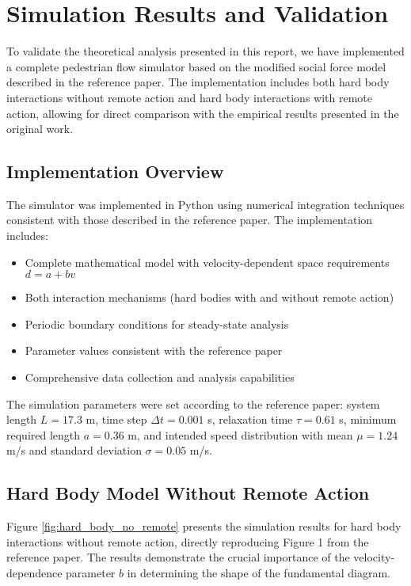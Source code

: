 \documentclass[12pt,a4paper]{article}
\begin{document}
\section{Simulation Results and Validation}

To validate the theoretical analysis presented in this report, we have implemented a complete pedestrian flow simulator based on the modified social force model described in the reference paper. The implementation includes both hard body interactions without remote action and hard body interactions with remote action, allowing for direct comparison with the empirical results presented in the original work.

\subsection{Implementation Overview}

The simulator was implemented in Python using numerical integration techniques consistent with those described in the reference paper. The implementation includes:

\begin{itemize}
\item Complete mathematical model with velocity-dependent space requirements $d = a + bv$
\item Both interaction mechanisms (hard bodies with and without remote action)
\item Periodic boundary conditions for steady-state analysis
\item Parameter values consistent with the reference paper
\item Comprehensive data collection and analysis capabilities
\end{itemize}

The simulation parameters were set according to the reference paper: system length $L = 17.3$ m, time step $\Delta t = 0.001$ s, relaxation time $\tau = 0.61$ s, minimum required length $a = 0.36$ m, and intended speed distribution with mean $\mu = 1.24$ m/s and standard deviation $\sigma = 0.05$ m/s.

\subsection{Hard Body Model Without Remote Action}

Figure \ref{fig:hard_body_no_remote} presents the simulation results for hard body interactions without remote action, directly reproducing Figure 1 from the reference paper. The results demonstrate the crucial importance of the velocity-dependence parameter $b$ in determining the shape of the fundamental diagram.
\end{document}
